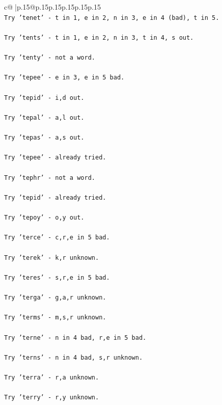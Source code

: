 \documentclass{article}
\begin{document}
{\begin{supertabular}{c@{$\;$}|p{.15\linewidth}@{}p{.15\linewidth}p{.15\linewidth}p{.15\linewidth}p{.15\linewidth}p{.15\linewidth}}
{{{\\ 
\texttt{Try 'tenet' {-} t in 1, e in 2, n in 3, e in 4 (bad), t in 5.} \\
\\ 
\texttt{Try 'tents' {-} t in 1, e in 2, n in 3, t in 4, s out.} \\
\\ 
\texttt{Try 'tenty' {-} not a word.} \\
\\ 
\texttt{Try 'tepee' {-} e in 3, e in 5 bad.} \\
\\ 
\texttt{Try 'tepid' {-} i,d out.} \\
\\ 
\texttt{Try 'tepal' {-} a,l out.} \\
\\ 
\texttt{Try 'tepas' {-} a,s out.} \\
\\ 
\texttt{Try 'tepee' {-} already tried.} \\
\\ 
\texttt{Try 'tephr' {-} not a word.} \\
\\ 
\texttt{Try 'tepid' {-} already tried.} \\
\\ 
\texttt{Try 'tepoy' {-} o,y out.} \\
\\ 
\texttt{Try 'terce' {-} c,r,e in 5 bad.} \\
\\ 
\texttt{Try 'terek' {-} k,r unknown.} \\
\\ 
\texttt{Try 'teres' {-} s,r,e in 5 bad.} \\
\\ 
\texttt{Try 'terga' {-} g,a,r unknown.} \\
\\ 
\texttt{Try 'terms' {-} m,s,r unknown.} \\
\\ 
\texttt{Try 'terne' {-} n in 4 bad, r,e in 5 bad.} \\
\\ 
\texttt{Try 'terns' {-} n in 4 bad, s,r unknown.} \\
\\ 
\texttt{Try 'terra' {-} r,a unknown.} \\
\\ 
\texttt{Try 'terry' {-} r,y unknown.} \\
\\ 
}}}
\end{supertabular}}
\end{document}
